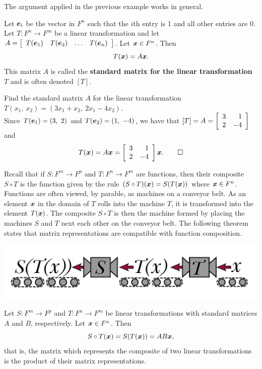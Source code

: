 The argument applied in the previous example works in general. \\

\begin{Thm} Let $\bb e_i$ be the vector in $F^n$ such that the $i$th entry is 1 and all other entries are 0. Let $T : F^n \to F^m$ be a linear transformation and let $A = \mtx{rrrrr}{T(\bb e_1) & T(\bb e_2) & \ldots & T(\bb e_n)}$. Let $\bb x \in F^n$. Then 
\[T(\bb x) = A\bb x.\] This matrix $A$ is called the \textbf{standard matrix for the linear transformation} $T$ and is often denoted $[T]$.
\end{Thm}\vs

\begin{Exam} Find the standard matrix $A$ for the linear transformation $T(x_1,\ x_2) = (3x_1+x_2,\ 2x_1-4x_2)$.\\

Since $T(\bb e_1) = (3,\ 2)$ and $T(\bb e_2) = (1,\ -4)$, we have that $[T] = A = \mtx{rr}{3&1\\2&-4}$ and \[T(\bb x) = A\bb x =  \mtx{rr}{3&1\\2&-4}\bb x.\qedhere\]
\end{Exam}\vs

Recall that if $S : F^m\to F^p$ and $T : F^n \to F^m$ are functions, then their composite $S\circ T$ is the function given by the rule $(S\circ T)(\bb x) = S(T(\bb x))$ where $\bb x\in F^n$. Functions are often viewed, by parable, as machines on a conveyor belt. As an element $\bb x$ in the domain of $T$ rolls into the machine $T$, it is transformed into the element $T(\bb x)$. The composite $S\circ T$ is then the machine formed by placing the machines $S$ and $T$ next each other on the conveyor belt. The following theorem states that matrix representations are compatible with function composition.

\centerline{\includegraphics[scale=1]{Chapter3/images/SoT.pdf}}

\begin{Thm} Let $S : F^m\to F^p$ and $T : F^n \to F^m$ be linear transformations with standard matrices $A$ and $B$, respectively. Let $\bb x \in F^n$. Then 
\[S\circ T(\bb x) = S(T(\bb x)) = AB\bb x,\] that is, the matrix which represents the composite of two linear transformations is the product of their matrix representations.
\end{Thm}\vs

